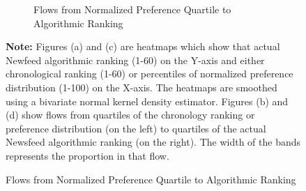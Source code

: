 \documentclass[12pt,letterpaper]{article}
\begin{document}
\begin{figure}[ht]
\begin{subfigure}{.5\textwidth}
        \caption{Flows from Normalized Preference Quartile to Algorithmic Ranking}
        \label{fig:nfpref_s}
    \end{subfigure}

\footnotesize \textbf{Note:} Figures (a) and (c) are heatmaps which show that actual Newfeed algorithmic ranking (1-60) on the Y-axis and either chronological ranking (1-60)  or percentiles of normalized preference distribution (1-100) on the X-axis. The heatmaps are smoothed using a bivariate normal kernel density estimator. Figures (b) and (d) show flows from quartiles of the chronology ranking or preference distribution (on the left) to quartiles of the actual Newsfeed algorithmic ranking (on the right). The width of the bands represents the proportion in that flow.
\end{figure}
\end{document}
